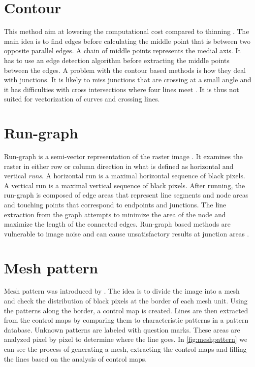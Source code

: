 \section{Contour}
This method aim at lowering the computational cost compared to thinning \cite{Wenyin1999}. The main idea is to find edges before calculating the middle point that is between two opposite parallel edges. A chain of middle points represents the medial axis. It has to use an edge detection algorithm before extracting the middle points between the edges. A problem with the contour based methods is how they deal with junctions. It is likely to miss junctions that are crossing at a small angle and it has difficulties with cross intersections where four lines meet \cite{Wenyin1999}. It is thus not suited for vectorization of curves and crossing lines.

\section{Run-graph}
Run-graph is a semi-vector representation of the raster image \cite{Monagan1993}. It examines the raster in either row or column direction in what is defined as horizontal and vertical \emph{runs}. A horizontal run is a maximal horizontal sequence of black pixels. A vertical run is a maximal vertical sequence of black pixels. After running, the run-graph is composed of edge areas that represent line segments and node areas and touching points that correspond to endpoints and junctions. The line extraction from the graph attempts to minimize the area of the node and maximize the length of the connected edges. Run-graph based methods are vulnerable to image noise and can cause unsatisfactory results at junction areas \cite{Karabork2008}.

\section{Mesh pattern}
Mesh pattern was introduced by \citet{Lin1985}. The idea is to divide the image into a mesh and check the distribution of black pixels at the border of each mesh unit. Using the patterns along the border, a control map is created. Lines are then extracted from the control maps by comparing them to characteristic patterns in a pattern database. Unknown patterns are labeled with question marks. These areas are analyzed pixel by pixel to determine where the line goes. In \autoref{fig:meshpattern} we can see the process of generating a mesh, extracting the control maps and filling the lines based on the analysis of control maps. 

